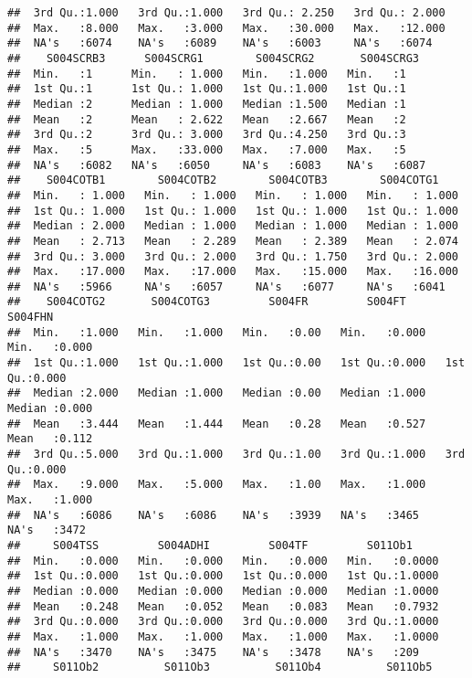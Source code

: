\documentclass[
]{article}
\begin{document}
\begin{verbatim}
##  3rd Qu.:1.000   3rd Qu.:1.000   3rd Qu.: 2.250   3rd Qu.: 2.000  
##  Max.   :8.000   Max.   :3.000   Max.   :30.000   Max.   :12.000  
##  NA's   :6074    NA's   :6089    NA's   :6003     NA's   :6074    
##    S004SCRB3      S004SCRG1        S004SCRG2       S004SCRG3   
##  Min.   :1      Min.   : 1.000   Min.   :1.000   Min.   :1     
##  1st Qu.:1      1st Qu.: 1.000   1st Qu.:1.000   1st Qu.:1     
##  Median :2      Median : 1.000   Median :1.500   Median :1     
##  Mean   :2      Mean   : 2.622   Mean   :2.667   Mean   :2     
##  3rd Qu.:2      3rd Qu.: 3.000   3rd Qu.:4.250   3rd Qu.:3     
##  Max.   :5      Max.   :33.000   Max.   :7.000   Max.   :5     
##  NA's   :6082   NA's   :6050     NA's   :6083    NA's   :6087  
##    S004COTB1        S004COTB2        S004COTB3        S004COTG1     
##  Min.   : 1.000   Min.   : 1.000   Min.   : 1.000   Min.   : 1.000  
##  1st Qu.: 1.000   1st Qu.: 1.000   1st Qu.: 1.000   1st Qu.: 1.000  
##  Median : 2.000   Median : 1.000   Median : 1.000   Median : 1.000  
##  Mean   : 2.713   Mean   : 2.289   Mean   : 2.389   Mean   : 2.074  
##  3rd Qu.: 3.000   3rd Qu.: 2.000   3rd Qu.: 1.750   3rd Qu.: 2.000  
##  Max.   :17.000   Max.   :17.000   Max.   :15.000   Max.   :16.000  
##  NA's   :5966     NA's   :6057     NA's   :6077     NA's   :6041    
##    S004COTG2       S004COTG3         S004FR         S004FT         S004FHN     
##  Min.   :1.000   Min.   :1.000   Min.   :0.00   Min.   :0.000   Min.   :0.000  
##  1st Qu.:1.000   1st Qu.:1.000   1st Qu.:0.00   1st Qu.:0.000   1st Qu.:0.000  
##  Median :2.000   Median :1.000   Median :0.00   Median :1.000   Median :0.000  
##  Mean   :3.444   Mean   :1.444   Mean   :0.28   Mean   :0.527   Mean   :0.112  
##  3rd Qu.:5.000   3rd Qu.:1.000   3rd Qu.:1.00   3rd Qu.:1.000   3rd Qu.:0.000  
##  Max.   :9.000   Max.   :5.000   Max.   :1.00   Max.   :1.000   Max.   :1.000  
##  NA's   :6086    NA's   :6086    NA's   :3939   NA's   :3465    NA's   :3472   
##     S004TSS         S004ADHI         S004TF         S011Ob1      
##  Min.   :0.000   Min.   :0.000   Min.   :0.000   Min.   :0.0000  
##  1st Qu.:0.000   1st Qu.:0.000   1st Qu.:0.000   1st Qu.:1.0000  
##  Median :0.000   Median :0.000   Median :0.000   Median :1.0000  
##  Mean   :0.248   Mean   :0.052   Mean   :0.083   Mean   :0.7932  
##  3rd Qu.:0.000   3rd Qu.:0.000   3rd Qu.:0.000   3rd Qu.:1.0000  
##  Max.   :1.000   Max.   :1.000   Max.   :1.000   Max.   :1.0000  
##  NA's   :3470    NA's   :3475    NA's   :3478    NA's   :209     
##     S011Ob2          S011Ob3          S011Ob4          S011Ob5      

\end{verbatim}
\end{document}
